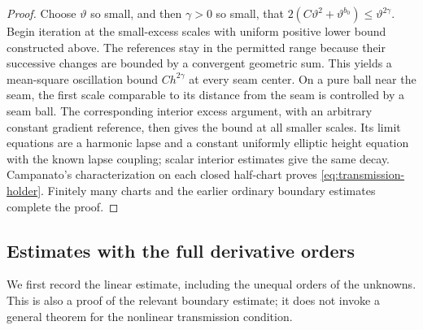 \begin{proof}
Choose $\vartheta$ so small, and then $\gamma>0$ so small, that
$2(C\vartheta^2+\vartheta^{b_0})\leq\vartheta^{2\gamma}$.
Begin iteration at the small-excess scales with uniform positive
lower bound constructed above.  The references stay in the permitted
range because their successive changes are bounded by a convergent
geometric sum.  This yields a mean-square oscillation bound
$Ch^{2\gamma}$ at every seam center.  On a pure ball near the seam,
the first scale comparable to its distance from the seam is controlled
by a seam ball.  The corresponding interior excess argument, with an
arbitrary constant gradient reference, then gives the bound at all
smaller scales.  Its limit equations are a harmonic lapse and a
constant uniformly elliptic height equation with the known lapse
coupling; scalar interior estimates give the same decay.  Campanato's
characterization on each closed half-chart proves
\eqref{eq:transmission-holder}.  Finitely many charts and the earlier
ordinary boundary estimates complete the proof.
\end{proof}

\subsection{Estimates with the full derivative orders}

We first record the linear estimate, including the unequal orders of
the unknowns.  This is also a proof of the relevant boundary estimate;
it does not invoke a general theorem for the nonlinear transmission
condition.

